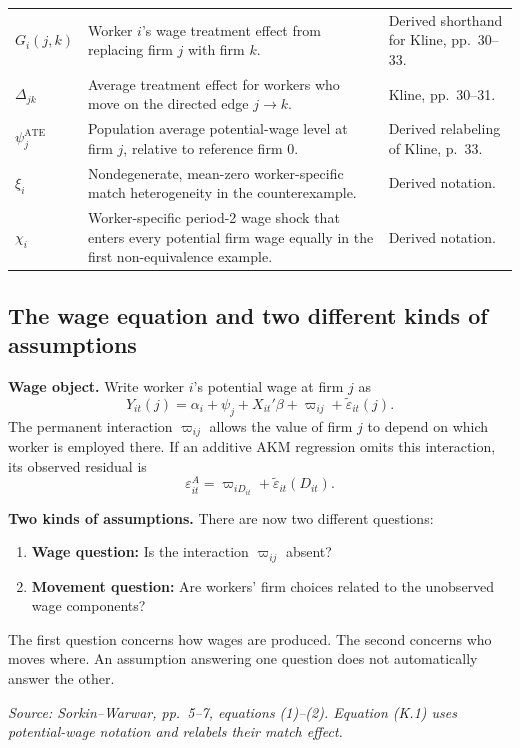 \documentclass[11pt]{article}
\begin{document}
\begin{longtable}{p{}p{}p{}}
\(G_i(j,k)\) & Worker \(i\)'s wage treatment effect from replacing firm
\(j\) with firm \(k\). & Derived shorthand for Kline, pp.\ 30--33. \\
\(\Delta_{jk}\) & Average treatment effect for workers who move on the
directed edge \(j\to k\). & Kline, pp.\ 30--31. \\
\(\psi_j^{\mathrm{ATE}}\) & Population average potential-wage level at firm
\(j\), relative to reference firm \(0\). & Derived relabeling of Kline,
p.\ 33. \\
\(\xi_i\) & Nondegenerate, mean-zero worker-specific match heterogeneity in the
counterexample. & Derived notation. \\
\(\chi_i\) & Worker-specific period-2 wage shock that enters every potential
firm wage equally in the first non-equivalence example. & Derived notation. \\
\end{longtable}

\subsection{The wage equation and two different kinds of assumptions}

\textbf{Wage object.}
Write worker \(i\)'s potential wage at firm \(j\) as
\[
Y_{it}(j)
=
\alpha_i+\psi_j+X_{it}'\beta
+\varpi_{ij}
+\widetilde\varepsilon_{it}(j).
\tag{K.1}
\]
The permanent interaction \(\varpi_{ij}\) allows the value of firm \(j\) to
depend on which worker is employed there.  If an additive AKM regression
omits this interaction, its observed residual is
\[
\varepsilon^A_{it}
=
\varpi_{iD_{it}}
+\widetilde\varepsilon_{it}(D_{it}).
\tag{K.2}
\]

\textbf{Two kinds of assumptions.}
There are now two different questions:

\begin{enumerate}
\item \textbf{Wage question:} Is the interaction
\(\varpi_{ij}\) absent?
\item \textbf{Movement question:} Are workers' firm choices related to the
unobserved wage components?
\end{enumerate}

The first question concerns how wages are produced.  The second concerns who
moves where.  An assumption answering one question does not automatically
answer the other.

\textit{Source: Sorkin--Warwar, pp.\ 5--7, equations (1)--(2).
Equation (K.1) uses potential-wage notation and relabels their match effect.}
\end{document}
